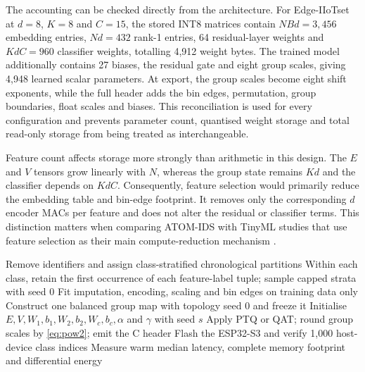 \documentclass[10pt,letterpaper,twocolumn]{article}
\begin{document}
The accounting can be checked directly from the architecture. For
Edge-IIoTset at $d=8$, $K=8$ and $C=15$, the stored INT8 matrices contain
$N B d=3{,}456$ embedding entries, $N d=432$ rank-1 entries, 64 residual-layer
weights and $K d C=960$ classifier weights, totalling 4,912 weight bytes. The
trained model additionally contains 27 biases, the residual gate and eight
group scales, giving 4,948 learned scalar parameters. At export, the group
scales become eight shift exponents, while the full header adds the bin edges,
permutation, group boundaries, float scales and biases. This reconciliation is
used for every configuration and prevents parameter count, quantised weight
storage and total read-only storage from being treated as interchangeable.

Feature count affects storage more strongly than arithmetic in this design.
The $E$ and $V$ tensors grow linearly with $N$, whereas the group state remains
$K d$ and the classifier depends on $K d C$. Consequently, feature selection
would primarily reduce the embedding table and bin-edge footprint. It removes
only the corresponding $d$ encoder MACs per feature and does not alter the
residual or classifier terms. This distinction matters when comparing ATOM-IDS
with TinyML studies that use feature selection as their main compute-reduction
mechanism \cite{hamdouchi2025tinyml}.

\begin{algorithm}[!t]
\caption{ATOM training and on-device evaluation.}
\label{alg:atom}
Remove identifiers and assign class-stratified chronological partitions\;
Within each class, retain the first occurrence of each feature-label tuple;
sample capped strata with seed 0\;
Fit imputation, encoding, scaling and bin edges on training data only\;
Construct one balanced group map with topology seed 0 and freeze it\;
Initialise $E,V,W_1,b_1,W_2,b_2,W_c,b_c,\alpha$ and $\gamma$ with seed $s$\;
Apply PTQ or QAT; round group scales by \eqref{eq:pow2}; emit the C header\;
Flash the ESP32-S3 and verify 1,000 host-device class indices\;
Measure warm median latency, complete memory footprint and differential energy\;
\end{algorithm}
\end{document}
